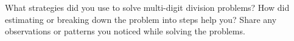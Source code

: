 \documentclass[12pt]{article}
\begin{document}
\vspace{1em}

\begin{tcolorbox}[colframe=black!60, colback=white, 
coltitle=black, colbacktitle=black!15, fonttitle=\bfseries\Large, 
title=Reflection, halign title=center, left=10pt, right=10pt, top=10pt, bottom=80pt]
What strategies did you use to solve multi-digit division problems? How did estimating or breaking down the problem into steps help you? Share any observations or patterns you noticed while solving the problems.
\end{tcolorbox}
\end{document}
